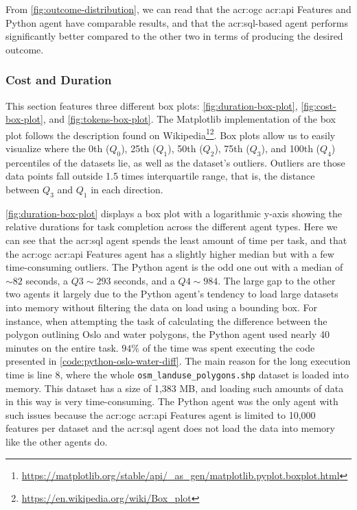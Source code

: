 From \autoref{fig:outcome-distribution}, we can read that the \acrshort{acr:ogc} \acrshort{acr:api} Features and Python agent have comparable results, and that the \acrshort{acr:sql}-based agent performs significantly better compared to the other two in terms of producing the desired outcome.

\subsubsection{Cost and Duration}

This section features three different box plots: \autoref{fig:duration-box-plot}, \autoref{fig:cost-box-plot}, and \autoref{fig:tokens-box-plot}. The Matplotlib implementation of the box plot follows the description found on Wikipedia\footnote{\url{https://matplotlib.org/stable/api/_as_gen/matplotlib.pyplot.boxplot.html}}\footnote{\url{https://en.wikipedia.org/wiki/Box_plot}}. Box plots allow us to easily visualize where the 0th ($Q_0$), 25th ($Q_1$), 50th ($Q_2$), 75th ($Q_3$), and 100th ($Q_4$) percentiles of the datasets lie, as well as the dataset's outliers. Outliers are those data points fall outside 1.5 times interquartile range, that is, the distance between $Q_3$ and $Q_1$ in each direction.

\autoref{fig:duration-box-plot} displays a box plot with a logarithmic y-axis showing the relative durations for task completion across the different agent types. Here we can see that the \acrshort{acr:sql} agent spends the least amount of time per task, and that the \acrshort{acr:ogc} \acrshort{acr:api} Features agent has a slightly higher median but with a few time-consuming outliers. The Python agent is the odd one out with a median of $\sim 82$ seconds, a $Q3 \sim 293$ seconds, and a $Q4 \sim 984$. The large gap to the other two agents it largely due to the Python agent's tendency to load large datasets into memory without filtering the data on load using a bounding box. For instance, when attempting the task of calculating the difference between the polygon outlining Oslo and water polygons, the Python agent used nearly 40 minutes on the entire task. $94\%$ of the time was spent executing the code presented in \autoref{code:python-oslo-water-diff}. The main reason for the long execution time is line 8, where the whole \texttt{osm\_landuse\_polygons.shp} dataset is loaded into memory. This dataset has a size of 1,383 MB, and loading such amounts of data in this way is very time-consuming. The Python agent was the only agent with such issues because the \acrshort{acr:ogc} \acrshort{acr:api} Features agent is limited to 10,000 features per dataset and the \acrshort{acr:sql} agent does not load the data into memory like the other agents do.

